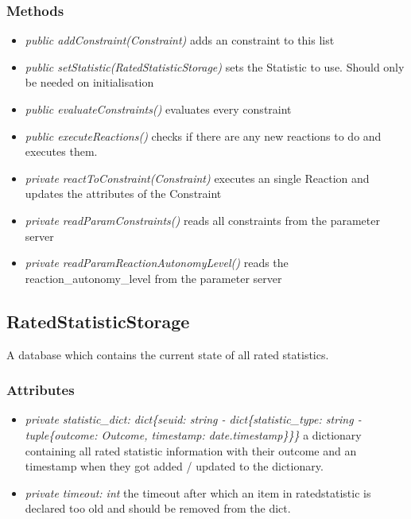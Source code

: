\subsubsection{Methods}
\begin{itemize}
	\item \textit{ public addConstraint(Constraint)  }
		adds an constraint to this list
	\item \textit{ public setStatistic(RatedStatisticStorage)  }
		sets the Statistic to use. Should only be needed on initialisation
	\item \textit{ public evaluateConstraints()  }
		evaluates every constraint
	\item \textit{ public executeReactions()  }
		checks if there are any new reactions to do and executes them.
	\item \textit{ private reactToConstraint(Constraint)  }
		executes an single Reaction and updates the attributes of the Constraint
	\item \textit{ private readParamConstraints()  }
		reads all constraints from the parameter server
	\item \textit{ private readParamReactionAutonomyLevel()  }
		reads the reaction\_autonomy\_level from the parameter server
\end{itemize}


\subsection{RatedStatisticStorage}
A database which contains the current state of all rated statistics.
\subsubsection{Attributes}
\begin{itemize}
	\item \textit{ private statistic\_dict: dict\{seuid: string - dict\{statistic\_type: string - tuple\{outcome: Outcome, timestamp: date.timestamp\}\}\}  }
		a dictionary containing all rated statistic information with their outcome and an timestamp when they got added / updated to the dictionary.
	\item \textit{ private timeout: int }
		the timeout after which an item in ratedstatistic is declared too old and should be removed from the dict.
\end{itemize}
